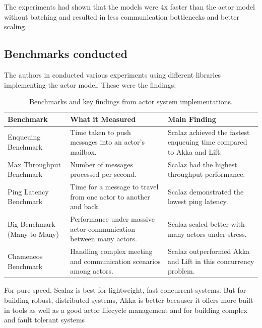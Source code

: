 The experiments had shown that the models were 4x faster than the actor model without batching and resulted in less communication bottlenecks and better scaling.

\subsection{Benchmarks conducted}
The authors in \cite{8892329} conducted various experiments using different libraries implementing the actor model. These were the findings:

\begin{table}[!htp]
    \centering
    \caption{Benchmarks and key findings from actor system implementations.}
    \label{tab:benchmarks_conducted}
    \begin{tabularx}{\textwidth}{|>{\raggedright\arraybackslash}X|>{\raggedright\arraybackslash}X|>{\raggedright\arraybackslash}X|}
        \hline
        \textbf{Benchmark} & \textbf{What it Measured} & \textbf{Main Finding} \\
        \hline
        Enqueuing Benchmark & Time taken to push messages into an actor's mailbox. & Scalaz achieved the fastest enqueuing time compared to Akka and Lift. \\
        \hline
        Max Throughput Benchmark & Number of messages processed per second. & Scalaz had the highest throughput performance. \\
        \hline
        Ping Latency Benchmark & Time for a message to travel from one actor to another and back. & Scalaz demonstrated the lowest ping latency. \\
        \hline
        Big Benchmark (Many-to-Many) & Performance under massive actor communication between many actors. & Scalaz scaled better with many actors under stress. \\
        \hline
        Chameneos Benchmark & Handling complex meeting and communication scenarios among actors. & Scalaz outperformed Akka and Lift in this concurrency problem. \\
        \hline
    \end{tabularx}
\end{table}

For pure speed, Scalaz is best for lightweight, fast concurrent systems. But for building robust, distributed systems, Akka is better becauser it offers more built-in tools as well as a good actor lifecycle management and for building complex and fault tolerant systems








